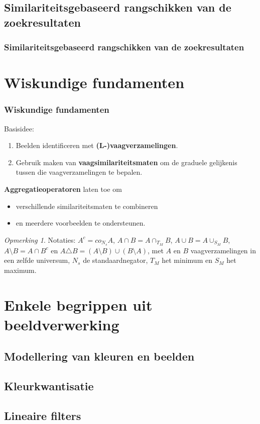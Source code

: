 \documentclass[dutch]{beamer}
\theoremstyle{definition}
\theoremstyle{remark}
\newtheorem{opmerking}[theorem]{Opmerking}
\theoremstyle{example}
\begin{document}
\subsection{Similariteitsgebaseerd rangschikken van de zoekresultaten}
\frame
{
  \frametitle{Similariteitsgebaseerd rangschikken van de zoekresultaten}
}

\section{Wiskundige fundamenten}
\frame
{
  \frametitle{Wiskundige fundamenten}

  Basisidee:
  \begin{enumerate}
  \item Beelden identificeren met \textbf{(L-)vaagverzamelingen}.
  \item Gebruik maken van \textbf{vaagsimilariteitsmaten} om de graduele 
  gelijkenis tussen die vaagverzamelingen te bepalen.
  \end{enumerate}
  
  \textbf{Aggregatieoperatoren} laten toe om
  \begin{itemize}
  \item verschillende similariteitsmaten te combineren
  \item en meerdere voorbeelden te ondersteunen.
  \end{itemize}
  
  \begin{opmerking}
  Notaties: $A^c = co_{N_s} A$, $A \cap B = A \cap_{T_M} B$, $A \cup B = A \cup_{S_M} B$,
  $A \setminus B = A \cap B^c$ en $A \triangle B = (A \setminus B) \cup (B \setminus A)$,
  met $A$ en $B$ vaagverzamelingen in een zelfde universum, $N_s$ de standaardnegator, 
  $T_M$ het minimum en $S_M$ het maximum.
  \end{opmerking}
}

\section{Enkele begrippen uit beeldverwerking}
\subsection{Modellering van kleuren en beelden}
\subsection{Kleurkwantisatie}
\subsection{Lineaire filters}
\end{document}
